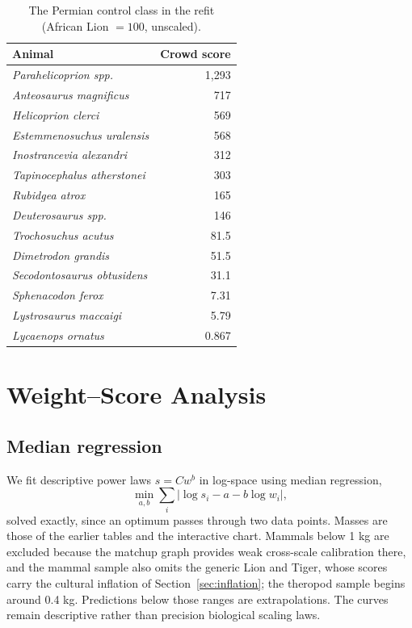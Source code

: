 \documentclass[11pt]{article}
\begin{document}
\begin{table}[H]
\centering
\small
\begin{tabular}{lr}
\toprule
Animal & Crowd score \\
\midrule
\textit{Parahelicoprion spp.} & 1,293 \\
\textit{Anteosaurus magnificus} & 717 \\
\textit{Helicoprion clerci} & 569 \\
\textit{Estemmenosuchus uralensis} & 568 \\
\textit{Inostrancevia alexandri} & 312 \\
\textit{Tapinocephalus atherstonei} & 303 \\
\textit{Rubidgea atrox} & 165 \\
\textit{Deuterosaurus spp.} & 146 \\
\textit{Trochosuchus acutus} & 81.5 \\
\textit{Dimetrodon grandis} & 51.5 \\
\textit{Secodontosaurus obtusidens} & 31.1 \\
\textit{Sphenacodon ferox} & 7.31 \\
\textit{Lystrosaurus maccaigi} & 5.79 \\
\textit{Lycaenops ornatus} & 0.867 \\
\bottomrule
\end{tabular}
\caption{The Permian control class in the refit (African Lion $=100$, unscaled).}
\label{tab:permian}
\end{table}

\section{Weight--Score Analysis}
\label{sec:weight}

\subsection{Median regression}
We fit descriptive power laws $s=Cw^b$ in log-space using median regression,
\[
\min_{a,b}\sum_i |\log s_i-a-b\log w_i|,
\]
solved exactly, since an optimum passes through two data points. Masses are those of the earlier tables and the interactive chart. Mammals below 1 kg are excluded because the matchup graph provides weak cross-scale calibration there, and the mammal sample also omits the generic Lion and Tiger, whose scores carry the cultural inflation of Section~\ref{sec:inflation}; the theropod sample begins around 0.4 kg. Predictions below those ranges are extrapolations. The curves remain descriptive rather than precision biological scaling laws.
\end{document}
